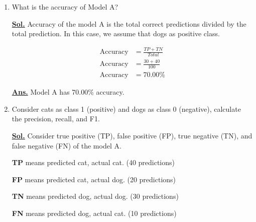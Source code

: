 \documentclass[12pt, a4paper]{article}
\newcommand{\sol}{\par\noindent\underline{\textbf{Sol.}} }
\newcommand{\ans}{\par\noindent\underline{\textbf{Ans.}} }
\begin{document}
    \begin{enumerate}

        \item[\textbf{T1.}] What is the accuracy of Model A?

            \sol Accuracy of the model A is the total correct predictions divided by the total prediction. In this case, we assume that dogs as positive class.

            \begin{align*}
            \text{Accuracy} &= \frac{TP + TN}{Total} \\[1em]
            \text{Accuracy} &= \frac{30 + 40}{100} \\[1em]
            \text{Accuracy} &= 70.00\%
            \end{align*}

            \ans Model A has 70.00\% accuracy.
        \pagebreak

        \item[\textbf{T2.}] Consider cats as class 1 (positive) and dogs as class 0 (negative), calculate the precision, recall, and F1.

            \sol Consider true positive (TP), false positive (FP), true negative (TN), and false negative (FN) of the model A.

            \textbf{TP} means predicted cat, actual cat. (40 predictions)

            \textbf{FP} means predicted cat, actual dog. (20 predictions)

            \textbf{TN} means predicted dog, actual dog. (30 predictions)

            \textbf{FN} means predicted dog, actual cat. (10 predictions)

            \vspace{1em}


\end{enumerate}
\end{document}
